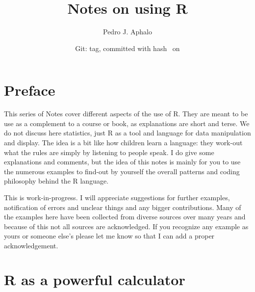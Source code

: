 \documentclass[paper=a4,10pt,div=17,headsepline,BCOR=12mm,twoside,open=right]{scrbook}\usepackage{knitr}
\title{Notes on using R}
\author{Pedro J. Aphalo}
\date{Git: tag\gitVtagn , committed with hash \gitAbbrevHash\ on \gitAuthorIsoDate}
\begin{document}











\maketitle


\tableofcontents




\chapter*{Preface}

This series of Notes cover different aspects of the use of R. They are meant to be use as a complement to a course or book, as explanations
are short and terse. We do not discuss here statistics, just R as a tool and language for data manipulation and display. The idea is a bit like how children learn a language: they work-out what the rules are simply by listening to people speak. I do give some explanations and comments, but the idea of this notes is mainly for you to use the numerous examples to find-out by yourself the overall patterns and coding philosophy behind the R language.

This is work-in-progress. I will appreciate suggestions for further examples, notification of errors and unclear things and any bigger contributions. Many of the examples here have been collected from diverse sources over many years and because of this not all sources are acknowledged. If you recognize any example as yours or someone else's please let me know so that I can add a proper acknowledgement.
 




\chapter{R as a powerful calculator}\label{chap:R:as:calc}
\end{document}
